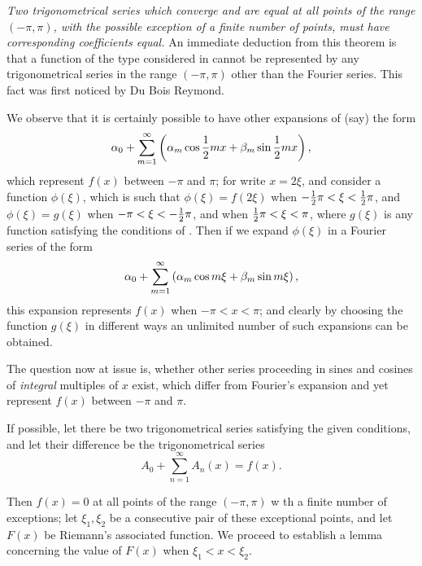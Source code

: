 \emph{Two trigonometrical series which converge and are equal at all points
  of the range $(-\pi, \pi)$, with the possible exception of a finite
  number of points, must have corresponding coefficients equal.}
An immediate deduction from this theorem is that a function of the
type considered in  cannot be represented
by any trigonometrical series in the range $(-\pi, \pi)$ other than
the Fourier series. This fact was first noticed by Du Bois Reymond.

We observe that it is certainly possible to have other expansions of
(say) the form
$$
\alpha_{0}
+
\sum_{m=1}^{\infty} \left( 
  \alpha_{m} \cos \frac{1}{2} mx
  +
  \beta_{m} \sin \frac{1}{2} mx
 \right),
$$
which represent $f(x)$ between $-\pi$ and $\pi$; for write
$x = 2\xi$, and
consider a function $\phi(\xi)$, which is such that
$\phi(\xi) = f(2\xi)$ when $-\frac{1}{2}\pi < \xi < \frac{1}{2}\pi$, and
$\phi(\xi) = g(\xi)$ when $-\pi < \xi < -\frac{1}{2} \pi$, and when
$\frac{1}{2} \pi < \xi < \pi$,
where $g(\xi)$ is any function satisfying the conditions of
. Then if we expand
$\phi(\xi)$ in a Fourier series of the form
$$
\alpha_{0}
+
\sum_{m=1}^{\infty} \left( 
  \alpha_{m} \cos m \xi
  +
  \beta_{m} \sin m \xi
 \right),
$$
this expansion represents $f(x)$ when $-\pi < x < \pi$; and clearly by
choosing the function $g(\xi)$ in different ways an unlimited number of
such expansions can be obtained.

The question now at issue is, whether other series proceeding in
sines and cosines of \emph{integral} multiples of $x$ exist, which differ from
Fourier's expansion and yet represent $f(x)$ between $-\pi$ and $\pi$.

If possible, let there be two trigonometrical series satisfying the
given conditions, and let their difference be the trigonometrical
series
$$
A_{0}
+
\sum_{n=1}^{\infty} A_{n}(x)
=
f(x).
$$

Then $f(x) = 0$ at all points of the range $(-\pi, \pi)$ w th a finite number
of exceptions; let $\xi_{1}, \xi_{2}$ be a consecutive pair of these exceptional
points, and let $F(x)$ be Riemann's associated function. We proceed to establish a
lemma concerning the value of $F(x)$ when $\xi_{1} < x < \xi_{2}$.

